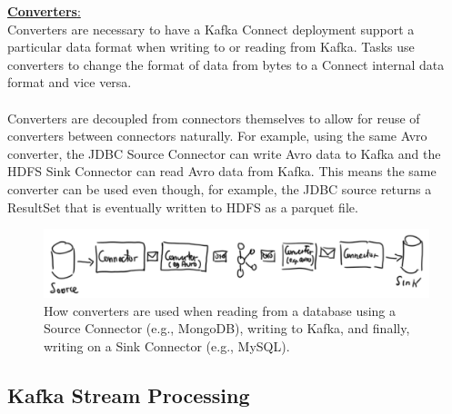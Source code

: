 \documentclass[10pt,a4paper]{article}
\newcommand{\nline}{\\~\\}
\begin{document}
\uline{\textbf{Converters}:} \\
Converters are necessary to have a Kafka Connect deployment support a particular data format when writing to or reading from Kafka. Tasks use converters to change the format of data from bytes to a Connect internal data format and vice versa. 
\nline
Converters are decoupled from connectors themselves to allow for reuse of converters between connectors naturally. For example, using the same Avro converter, the JDBC Source Connector can write Avro data to Kafka and the HDFS Sink Connector can read Avro data from Kafka. This means the same converter can be used even though, for example, the JDBC source returns a ResultSet that is eventually written to HDFS as a parquet file.
\begin{figure}[ht!]
 \hfill \includegraphics[width=350pt]{images/avro-converter}\hspace*{\fill}
 \caption{How converters are used when reading from a database using a Source Connector (e.g., MongoDB), writing to Kafka, and finally, writing on a Sink Connector (e.g., MySQL).}
\end{figure} 
\subsection{Kafka Stream Processing}
\clearpage


  
\end{document}
